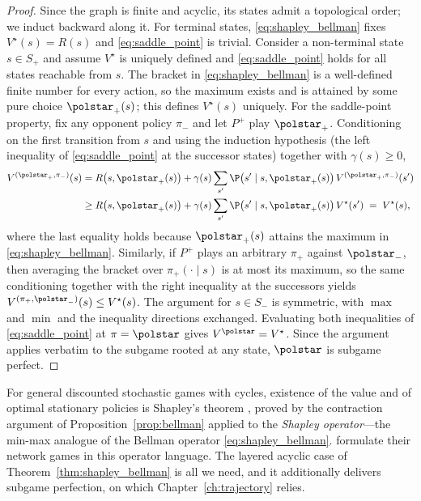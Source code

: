 \begin{proof}
Since the graph is finite and acyclic, its states admit a topological order; we induct backward along it. For terminal states, \eqref{eq:shapley_bellman} fixes $V^{\star}(s) = R(s)$ and \eqref{eq:saddle_point} is trivial. Consider a non-terminal state $s \in S_{+}$ and assume $V^{\star}$ is uniquely defined and \eqref{eq:saddle_point} holds for all states reachable from $s$. The bracket in \eqref{eq:shapley_bellman} is a well-defined finite number for every action, so the maximum exists and is attained by some pure choice $\polstar_{+}(s)$; this defines $V^{\star}(s)$ uniquely. For the saddle-point property, fix any opponent policy $\pi_{-}$ and let $P^{+}$ play $\polstar_{+}$. Conditioning on the first transition from $s$ and using the induction hypothesis (the left inequality of \eqref{eq:saddle_point} at the successor states) together with $\gamma(s) \ge 0$,
\begin{align*}
	V^{(\polstar_{+}, \pi_{-})}(s)
	&= R\bigl(s, \polstar_{+}(s)\bigr) + \gamma(s) \sum_{s'} \P\bigl(s' \mid s, \polstar_{+}(s)\bigr)\, V^{(\polstar_{+}, \pi_{-})}(s') \\
	&\ge R\bigl(s, \polstar_{+}(s)\bigr) + \gamma(s) \sum_{s'} \P\bigl(s' \mid s, \polstar_{+}(s)\bigr)\, V^{\star}(s')
	\;=\; V^{\star}(s),
\end{align*}
where the last equality holds because $\polstar_{+}(s)$ attains the maximum in \eqref{eq:shapley_bellman}. Similarly, if $P^{+}$ plays an arbitrary $\pi_{+}$ against $\polstar_{-}$, then averaging the bracket over $\pi_{+}(\cdot \mid s)$ is at most its maximum, so the same conditioning together with the right inequality at the successors yields $V^{(\pi_{+}, \polstar_{-})}(s) \le V^{\star}(s)$. The argument for $s \in S_{-}$ is symmetric, with $\max$ and $\min$ and the inequality directions exchanged. Evaluating both inequalities of \eqref{eq:saddle_point} at $\pi = \polstar$ gives $V^{\polstar} = V^{\star}$. Since the argument applies verbatim to the subgame rooted at any state, $\polstar$ is subgame perfect.
\end{proof}

\begin{remark}\label{rem:shapley_history}
For general discounted stochastic games with cycles, existence of the value and of optimal stationary policies is Shapley's theorem \parencite{Shapley1953stochastic}, proved by the contraction argument of Proposition~\ref{prop:bellman} applied to the \emph{Shapley operator}---the min-max analogue of the Bellman operator \eqref{eq:shapley_bellman}. \textcite{Gaubert2025} formulate their network games in this operator language. The layered acyclic case of Theorem~\ref{thm:shapley_bellman} is all we need, and it additionally delivers subgame perfection, on which Chapter~\ref{ch:trajectory} relies.
\end{remark}

